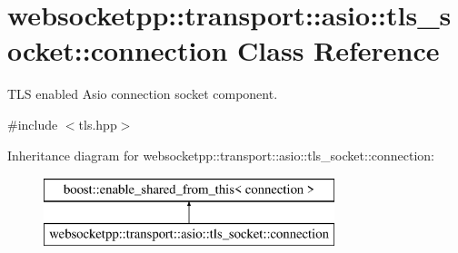 \hypertarget{classwebsocketpp_1_1transport_1_1asio_1_1tls__socket_1_1connection}{}\section{websocketpp\+:\+:transport\+:\+:asio\+:\+:tls\+\_\+socket\+:\+:connection Class Reference}
\label{classwebsocketpp_1_1transport_1_1asio_1_1tls__socket_1_1connection}


T\+L\+S enabled Asio connection socket component.  




{\ttfamily \#include $<$tls.\+hpp$>$}

Inheritance diagram for websocketpp\+:\+:transport\+:\+:asio\+:\+:tls\+\_\+socket\+:\+:connection\+:\begin{figure}[H]
\begin{center}
\leavevmode
\includegraphics[height=2.000000cm]{classwebsocketpp_1_1transport_1_1asio_1_1tls__socket_1_1connection}
\end{center}
\end{figure}

